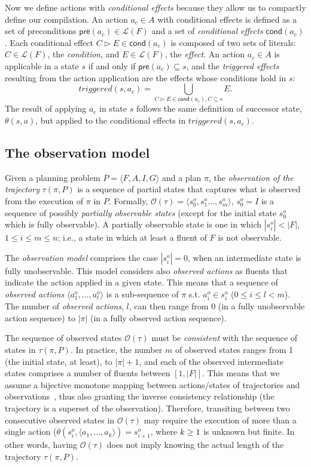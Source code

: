 \documentclass[runningheads]{llncs}
\newcommand{\tup}[1]{{\langle #1 \rangle}}
\newcommand{\pre}{\mathsf{pre}}     %
\newcommand{\cond}{\mathsf{cond}}   %
\begin{document}
Now we define actions with {\em conditional effects} because they allow us to compactly define our compilation. An action $a_c\in A$ with conditional effects is defined as a set of preconditions $\pre(a_c)\in\mathcal{L}(F)$ and a set of {\em conditional effects} $\cond(a_c)$. Each conditional effect $C\rhd E\in\cond(a_c)$ is composed of two sets of literals: $C\in\mathcal{L}(F)$, the {\em condition}, and $E\in\mathcal{L}(F)$, the {\em effect}. An action $a_c\in A$ is applicable in a state $s$ if and only if $\pre(a_c)\subseteq s$, and the {\em triggered effects} resulting from the action application are the effects whose conditions hold in $s$:
\[
triggered(s,a_c)=\bigcup\limits_{C\rhd E\in\cond(a_c),C\subseteq s} E. 
\]
The result of applying $a_c$ in state $s$ follows the same definition of successor state, $\theta(s,a)$, but applied to the conditional effects in $triggered(s,a_c)$.

\subsection{The observation model}
Given a planning problem $P=\tup{F,A,I,G}$ and a plan $\pi$, the \emph{observation of the trajectory} $\tau(\pi,P)$ is a sequence of partial states that captures what is observed from the execution of $\pi$ in $P$. Formally, $\mathcal{O}(\tau)=\tup{s_0^o,s_1^o \ldots , s_m^o}$, $s_0^o=I$ is a sequence of possibly {\em partially observable states} (except for the initial state $s_0^o$ which is fully observable). A partially observable state is one in which $|s_i^o| < |F|$, {\small $1\leq i\leq m\leq n$}; i.e., a state in which at least a fluent of $F$ is not observable.

The {\em observation model} comprises the case $|s_i^o| = 0$, when an intermediate state is fully unobservable. This model considers also {\em observed actions} as fluents that indicate the action applied in a given state. This means that a sequence of {\em observed actions} $\tup{a_1^o, \ldots, a_l^o}$ is a sub-sequence of $\pi$ s.t. $a_i^o\in s_i^o$ ({\small $0\leq i\leq l <m$}).  The number of {\em observed actions}, $l$, can then range from $0$ (in a fully unobservable action sequence) to $|\pi|$ (in a fully observed action sequence).

The sequence of observed states $\mathcal{O}(\tau)$ must be {\em consistent} with the sequence of states in $\tau(\pi,P)$. In practice, the number $m$ of observed states ranges from 1 (the initial state, at least), to $|\pi|+1$, and each of the observed intermediate states comprises a number of fluents between $[1,|F|]$.  This means that we assume a bijective monotone mapping between actions/states of trajectories and observations~\cite{ramirez2009plan}, thus also granting the inverse consistency relationship (the trajectory is a superset of the observation). Therefore, transiting between two consecutive observed states in $\mathcal{O}(\tau)$ may require the execution of more than a single action ($\theta(s_i^o,\tup{a_1,\ldots,a_k})=s_{i+1}^o$, where ${\small k\geq 1}$ is unknown but finite. In other words, having $\mathcal{O}(\tau)$ does not imply knowing the actual length of the trajectory $\tau(\pi,P)$.
\end{document}
